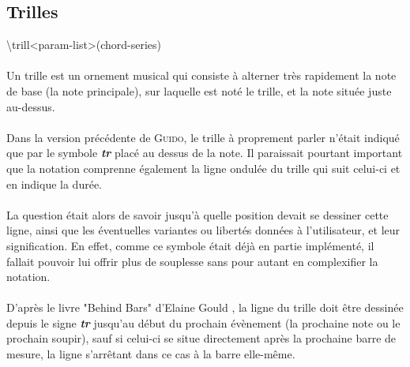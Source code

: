 \documentclass[a4paper,10pt,twocolumn]{article}
\newenvironment{code}
  {\fontfamily{pnc}\selectfont}{}
\begin{document}
\subsection{Trilles}

\begin{code}
\textbackslash{}trill\textless{}param-list\textgreater{}(chord-series)
\end{code}
\\


\paragraph{}
Un trille est \og{}un ornement musical qui consiste à alterner très rapidement la note de base (la note principale), sur laquelle est noté le trille, et la note située juste au-dessus\fg{}.

\paragraph{}
Dans la version précédente de \textsc{Guido}, le trille à proprement parler n'était indiqué que par le symbole \textit{\textbf{tr}} placé au dessus de la note. Il paraissait pourtant important que la notation comprenne également la ligne ondulée du trille qui suit celui-ci et en indique la durée.

\paragraph{}
La question était alors de savoir jusqu'à quelle position devait se dessiner cette ligne, ainsi que les éventuelles variantes ou libertés données à l'utilisateur, et leur signification. En effet, comme ce symbole était déjà en partie implémenté, il fallait pouvoir lui offrir plus de souplesse sans pour autant en complexifier la notation.

\paragraph{}
D'après le livre "Behind Bars" d'Elaine Gould \cite{ref2}, la ligne du trille doit être dessinée depuis le signe \textit{\textbf{tr}} jusqu'au début du prochain évènement (la prochaine note ou le prochain soupir), sauf si celui-ci se situe directement après la prochaine barre de mesure, la ligne s'arrêtant dans ce cas à la barre elle-même. 
\end{document}
